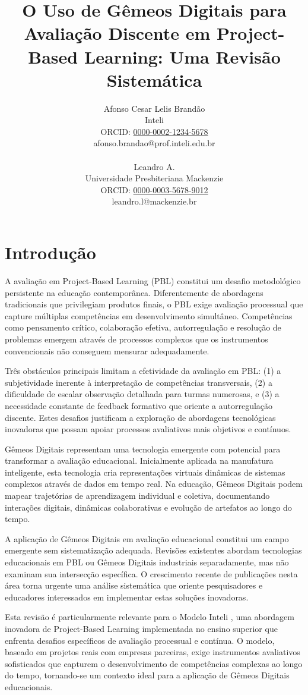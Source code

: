 \documentclass[english, spanish, brazilian]{RBIEarticle} %
\title{O Uso de Gêmeos Digitais para Avaliação Discente em Project-Based Learning: Uma Revisão Sistemática}
\author{%
\parbox{8cm}{%
Afonso Cesar Lelis Brandão\\
Inteli\\
ORCID: \href{https://orcid.org/0000-0002-1234-5678}{0000-0002-1234-5678}\\
afonso.brandao@prof.inteli.edu.br\\\\
Leandro A.\\
Universidade Presbiteriana Mackenzie\\
ORCID: \href{https://orcid.org/0000-0003-5678-9012}{0000-0003-5678-9012}\\
leandro.l@mackenzie.br}}
\begin{document}
\maketitle

\section{Introdução}

A avaliação em Project-Based Learning (PBL) constitui um desafio metodológico persistente na educação contemporânea. Diferentemente de abordagens tradicionais que privilegiam produtos finais, o PBL exige avaliação processual que capture múltiplas competências em desenvolvimento simultâneo. Competências como pensamento crítico, colaboração efetiva, autorregulação e resolução de problemas emergem através de processos complexos que os instrumentos convencionais não conseguem mensurar adequadamente.

Três obstáculos principais limitam a efetividade da avaliação em PBL: (1) a subjetividade inerente à interpretação de competências transversais, (2) a dificuldade de escalar observação detalhada para turmas numerosas, e (3) a necessidade constante de feedback formativo que oriente a autorregulação discente. Estes desafios justificam a exploração de abordagens tecnológicas inovadoras que possam apoiar processos avaliativos mais objetivos e contínuos.

Gêmeos Digitais representam uma tecnologia emergente com potencial para transformar a avaliação educacional. Inicialmente aplicada na manufatura inteligente, esta tecnologia cria representações virtuais dinâmicas de sistemas complexos através de dados em tempo real. Na educação, Gêmeos Digitais podem mapear trajetórias de aprendizagem individual e coletiva, documentando interações digitais, dinâmicas colaborativas e evolução de artefatos ao longo do tempo.

A aplicação de Gêmeos Digitais em avaliação educacional constitui um campo emergente sem sistematização adequada. Revisões existentes abordam tecnologias educacionais em PBL ou Gêmeos Digitais industriais separadamente, mas não examinam sua intersecção específica. O crescimento recente de publicações nesta área torna urgente uma análise sistemática que oriente pesquisadores e educadores interessados em implementar estas soluções inovadoras.

Esta revisão é particularmente relevante para o Modelo Inteli \parencite{Inteli2024}, uma abordagem inovadora de Project-Based Learning implementada no ensino superior que enfrenta desafios específicos de avaliação processual e contínua. O modelo, baseado em projetos reais com empresas parceiras, exige instrumentos avaliativos sofisticados que capturem o desenvolvimento de competências complexas ao longo do tempo, tornando-se um contexto ideal para a aplicação de Gêmeos Digitais educacionais.
\end{document}
